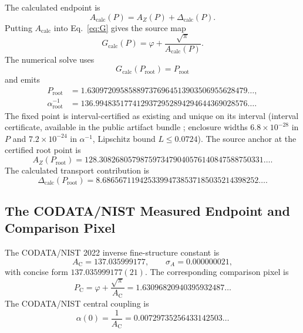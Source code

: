 \documentclass[11pt]{article}
\theoremstyle{remark}
\newcommand{\alphainv}{\alpha^{-1}}
\newcommand{\AZ}{A_Z}
\newcommand{\Ppub}{P_{\mathrm C}}
\newcommand{\Dcalc}{\Delta_{\mathrm{calc}}}
\begin{document}
The calculated endpoint is
\begin{equation}
A_{\mathrm{calc}}(P)
=
\AZ(P)+\Dcalc(P).
\label{eq:Acalc}
\end{equation}
Putting \(A_{\mathrm{calc}}\) into Eq.~\eqref{eq:G} gives the source map
\begin{equation}
G_{\mathrm{calc}}(P)
=
\varphi+\frac{\sqrt\pi}{A_{\mathrm{calc}}(P)}.
\label{eq:Gcalc}
\end{equation}
The numerical solve uses
\begin{equation}
G_{\mathrm{calc}}(P_{\mathrm{root}})=P_{\mathrm{root}}
\label{eq:Proot}
\end{equation}
and emits
\begin{align}
P_{\mathrm{root}}
&=
1.630972095858897376964513903506955628479\ldots,
\label{eq:Prootnum}\\
\alphainv_{\mathrm{root}}
&=
136.9948351774129372952894294644369028576\ldots.
\label{eq:alpharoot}
\end{align}
The fixed point is interval-certified as
existing and unique on its interval (interval certificate,
available in the public artifact bundle \cite{oph-code};
enclosure widths \(6.8\times10^{-28}\) in \(P\) and \(7.2\times10^{-24}\) in
\(\alpha^{-1}\), Lipschitz bound \(L\le0.0724\)).
The source anchor at the certified root point is
\begin{equation}
\AZ(P_{\mathrm{root}})
=
128.3082680579875973479040576140847588750331\ldots.
\label{eq:AZroot}
\end{equation}
The calculated transport contribution is
\begin{equation}
\Dcalc(P_{\mathrm{root}})
=
8.68656711942533994738537185035214398252\ldots.
\label{eq:Dcalcroot}
\end{equation}


\subsection{The CODATA/NIST Measured Endpoint and Comparison Pixel}
\label{sec:alpha-step-16}

The CODATA/NIST 2022 inverse fine-structure constant \cite{nist-value,nist-wall} is
\begin{equation}
A_{\mathrm C}=137.035999177,
\qquad
\sigma_A=0.000000021,
\label{eq:codata}
\end{equation}
with concise form \(137.035999177(21)\). The corresponding comparison pixel is
\begin{equation}
\Ppub
=
\varphi+\frac{\sqrt\pi}{A_{\mathrm C}}
=
1.63096820940395932487\ldots
\label{eq:Ppub}
\end{equation}
The CODATA/NIST central coupling is
\begin{equation}
\alpha(0)
=
\frac{1}{A_{\mathrm C}}
=
0.00729735256433142503\ldots
\label{eq:alphapub}
\end{equation}
\end{document}
